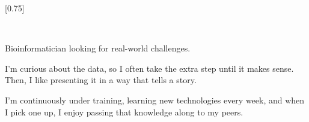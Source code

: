 \documentclass[verylight]{simplehipstercv}
\begin{document}
\setlength{\columnsep}{1.5cm}
[0.75]
\begin{paracol}{2}
\flushright
\paracolbackgroundoptions


\footnotesize
{\setasidefontcolour
\flushright
\begin{center}
\end{center}

\vspace{1em}



\vspace{1em}

\vspace{1em}

\setlength{\parindent}{0pt}
\vspace{1em}

\setlength{\parindent}{0pt}
\vspace{1em}

\\[0.5em]
\vspace{0.5em}

Bioinformatician looking for real-world challenges. 

I'm curious about the data, so I often take the extra step until it makes sense. Then, I like presenting it in a way that tells a story. 
\vspace{0.5em}

I'm continuously under training, learning new technologies every week, and when I pick one up, I enjoy passing that knowledge along to my peers. 



\vspace{2em}


 \\[0.5em]
\vspace{0.5em}

}
\end{paracol}
\end{document}
